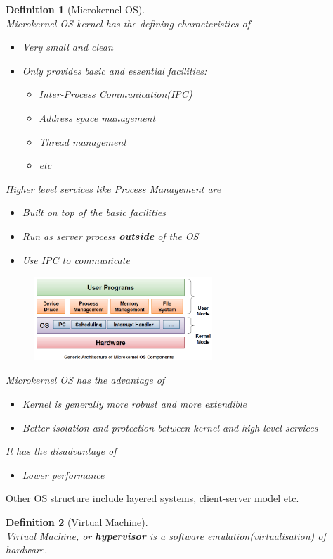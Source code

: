 \documentclass[12pt]{article}
\newtheorem{definition}{Definition}[section]
\theoremstyle{definition}
\begin{document}
\begin{definition}[Microkernel OS]
\hfill\\\normalfont Microkernel OS kernel has the defining characteristics of 
\begin{itemize}
  \item Very small and clean
  \item Only provides basic and essential facilities:
  \begin{itemize}
    \item Inter-Process Communication(IPC)
    \item Address space management
    \item Thread management
    \item etc
  \end{itemize}
\end{itemize}
Higher level services like Process Management are
\begin{itemize}
  \item Built \textit{on top of} the basic facilities
  \item Run as server process \textbf{outside} of the OS
  \item Use IPC to communicate
\end{itemize}
\begin{figure}[h]
\centering
\includegraphics[width = 0.6\textwidth]{1_7.png}
\end{figure}
Microkernel OS has the advantage of
\begin{itemize}
  \item Kernel is generally more robust and more extendible
  \item Better isolation and protection between kernel and high level services
\end{itemize}
It has the disadvantage of
\begin{itemize}
  \item Lower performance
\end{itemize}
\end{definition}
Other OS structure include layered systems, client-server model etc.
\begin{definition}[Virtual Machine]
\hfill\\\normalfont Virtual Machine, or \textbf{hypervisor} is a software emulation(virtualisation) of hardware.
\end{definition}
\end{document}
